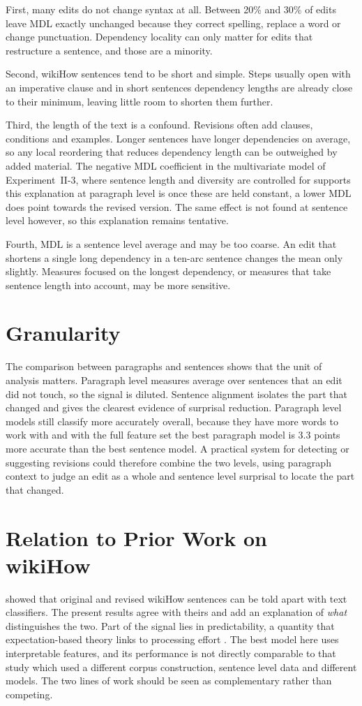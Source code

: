 \documentclass[12pt,a4paper,oneside]{report}
\begin{document}
First, many edits do not change syntax at all. Between 20\% and 30\% of edits leave MDL exactly unchanged because they correct spelling, replace a word or change punctuation. Dependency locality can only matter for edits that restructure a sentence, and those are a minority.

Second, wikiHow sentences tend to be short and simple. Steps usually open with an imperative clause and in short sentences dependency lengths are already close to their minimum, leaving little room to shorten them further.

Third, the length of the text is a confound. Revisions often add clauses, conditions and examples. Longer sentences have longer dependencies on average, so any local reordering that reduces dependency length can be outweighed by added material. The negative MDL coefficient in the multivariate model of Experiment~II-3, where sentence length and diversity are controlled for supports this explanation at paragraph level is once these are held constant, a lower MDL does point towards the revised version. The same effect is not found at sentence level however, so this explanation remains tentative.

Fourth, MDL is a sentence level average and may be too coarse. An edit that shortens a single long dependency in a ten-arc sentence changes the mean only slightly. Measures focused on the longest dependency, or measures that take sentence length into account, may be more sensitive.

\section{Granularity}
The comparison between paragraphs and sentences shows that the unit of analysis matters. Paragraph level measures average over sentences that an edit did not touch, so the signal is diluted. Sentence alignment isolates the part that changed and gives the clearest evidence of surprisal reduction. Paragraph level models still classify more accurately overall, because they have more words to work with and with the full feature set the best paragraph model is 3.3 points more accurate than the best sentence model. A practical system for detecting or suggesting revisions could therefore combine the two levels, using paragraph context to judge an edit as a whole and sentence level surprisal to locate the part that changed.

\section{Relation to Prior Work on wikiHow}
\citet{anthonio2020} showed that original and revised wikiHow sentences can be told apart with text classifiers. The present results agree with theirs and add an explanation of \emph{what} distinguishes the two. Part of the signal lies in predictability, a quantity that expectation-based theory links to processing effort \citep{hale2001}. The best model here uses interpretable features, and its performance is not directly comparable to that study which used a different corpus construction, sentence level data and different models. The two lines of work should be seen as complementary rather than competing.
\end{document}
